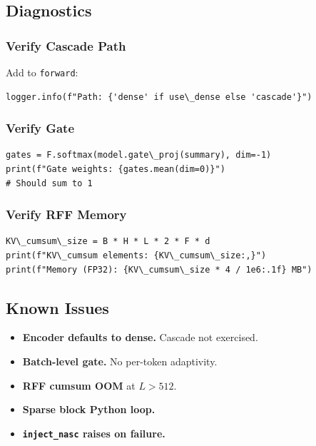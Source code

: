 \subsection{Diagnostics}

\subsubsection{Verify Cascade Path}

Add to \texttt{forward}:

\begin{lstlisting}
logger.info(f"Path: {'dense' if use\_dense else 'cascade'}")
\end{lstlisting}

\subsubsection{Verify Gate}

\begin{lstlisting}
gates = F.softmax(model.gate\_proj(summary), dim=-1)
print(f"Gate weights: {gates.mean(dim=0)}")
# Should sum to 1
\end{lstlisting}

\subsubsection{Verify RFF Memory}

\begin{lstlisting}
KV\_cumsum\_size = B * H * L * 2 * F * d
print(f"KV\_cumsum elements: {KV\_cumsum\_size:,}")
print(f"Memory (FP32): {KV\_cumsum\_size * 4 / 1e6:.1f} MB")
\end{lstlisting}

\subsection{Known Issues}

\begin{itemize}
\item \textbf{Encoder defaults to dense.} Cascade not exercised.
\item \textbf{Batch-level gate.} No per-token adaptivity.
\item \textbf{RFF cumsum OOM} at $L > 512$.
\item \textbf{Sparse block Python loop.}
\item \textbf{\texttt{inject\_nasc} raises on failure.}

\end{itemize}
